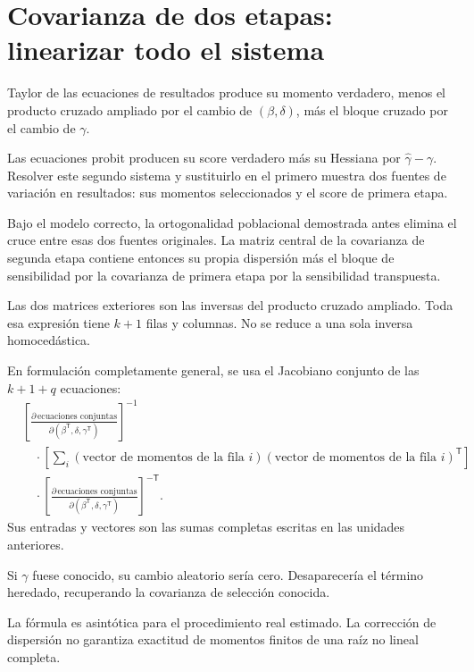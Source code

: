 \documentclass[11pt,a4paper]{article}
\newcommand{\T}{^{\mathsf T}}
\begin{document}
\clearpage
\section{Covarianza de dos etapas: linearizar todo el sistema}\label{unidad138}
Taylor de las ecuaciones de resultados
produce su momento verdadero,
menos el producto cruzado
ampliado por el cambio
de \((\beta,\delta)\),
más el bloque cruzado
por el cambio de \(\gamma\).

Las ecuaciones probit producen
su score verdadero más
su Hessiana por
\(\widehat\gamma-\gamma\).
Resolver este segundo sistema
y sustituirlo en el primero
muestra dos fuentes de
variación en resultados:
sus momentos seleccionados y
el score de primera etapa.

Bajo el modelo correcto,
la ortogonalidad poblacional
demostrada antes elimina
el cruce entre esas dos
fuentes originales.
La matriz central de
la covarianza de segunda etapa
contiene entonces su propia
dispersión más el bloque
de sensibilidad por la
covarianza de primera etapa
por la sensibilidad transpuesta.

Las dos matrices exteriores
son las inversas del
producto cruzado ampliado.
Toda esa expresión tiene
\(k+1\) filas y columnas.
No se reduce a
una sola inversa homocedástica.

En formulación completamente general,
se usa el Jacobiano conjunto
de las \(k+1+q\) ecuaciones:
\[
\begin{aligned}
&\left[\frac{\partial\,\text{ecuaciones conjuntas}}
{\partial(\beta\T,\delta,\gamma\T)}\right]^{-1}\\
&\quad\cdot
\left[\sum_i
(\text{vector de momentos de la fila }i)
(\text{vector de momentos de la fila }i)\T\right]\\
&\quad\cdot
\left[\frac{\partial\,\text{ecuaciones conjuntas}}
{\partial(\beta\T,\delta,\gamma\T)}\right]^{-\mathsf T}.
\end{aligned}
\]
Sus entradas y vectores son
las sumas completas escritas
en las unidades anteriores.

\begin{ejemplo}[Referencia]
Si \(\gamma\) fuese conocido,
su cambio aleatorio sería cero.
Desaparecería el término heredado,
recuperando la covarianza
de selección conocida.
\end{ejemplo}
La fórmula es asintótica para
el procedimiento real estimado.
La corrección de dispersión
no garantiza exactitud de
momentos finitos de una
raíz no lineal completa.

\clearpage
\end{document}
